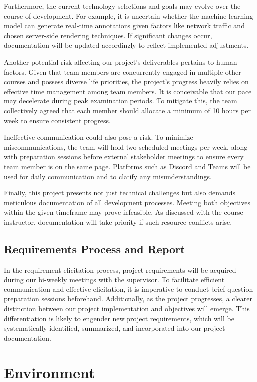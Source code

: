 \documentclass[12pt]{article}
\begin{document}
Furthermore, the current technology selections and goals may evolve over the course of development. For example, it is uncertain whether the machine learning model can generate real-time annotations given factors like network traffic and chosen server-side rendering techniques. If significant changes occur, documentation will be updated accordingly to reflect implemented adjustments.

Another potential risk affecting our project's deliverables pertains to human factors. Given that team members are concurrently engaged in multiple other courses and possess diverse life priorities, the project's progress heavily relies on effective time management among team members. It is conceivable that our pace may decelerate during peak examination periods. To mitigate this, the team collectively agreed that each member should allocate a minimum of 10 hours per week to ensure consistent progress.

Ineffective communication could also pose a risk. To minimize miscommunications, the team will hold two scheduled meetings per week, along with preparation sessions before external stakeholder meetings to ensure every team member is on the same page. Platforms such as Discord and Teams will be used for daily communication and to clarify any misunderstandings.

Finally, this project presents not just technical challenges but also demands meticulous documentation of all development processes. Meeting both objectives within the given timeframe may prove infeasible. As discussed with the course instructor, documentation will take priority if such resource conflicts arise.

\subsection{Requirements Process and Report}
In the requirement elicitation process, project requirements will be acquired during our bi-weekly meetings with the supervisor. To facilitate efficient communication and effective elicitation, it is imperative to conduct brief question preparation sessions beforehand. Additionally, as the project progresses, a clearer distinction between our project implementation and objectives will emerge. This differentiation is likely to engender new project requirements, which will be systematically identified, summarized, and incorporated into our project documentation.

\section{Environment}
\end{document}
